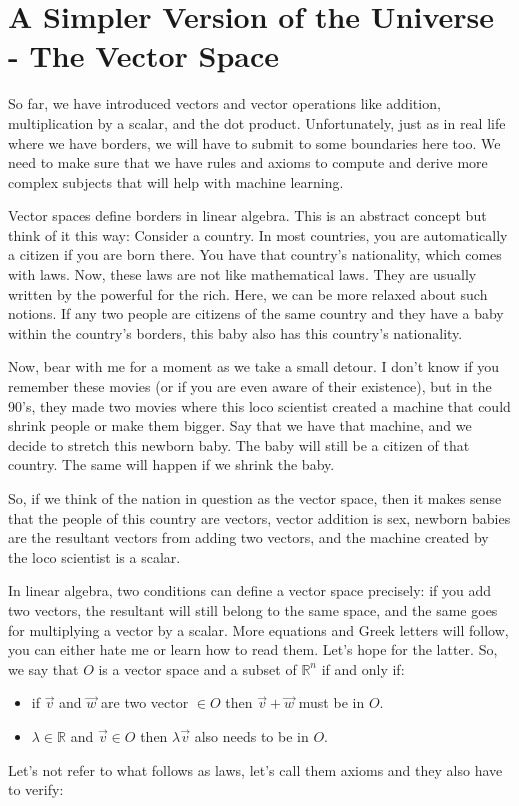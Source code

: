 \documentclass[a4,12pt,twosided,openany]{memoir}
\begin{document}
\section{A Simpler Version of the Universe - The Vector Space}
\par 
\indent
So far, we have introduced vectors and vector operations like addition, multiplication by a scalar, and the dot product. Unfortunately, just as in real life where we have borders, we will have to submit to some boundaries here too. We need to make sure that we have rules and axioms to compute and derive more complex subjects that will help with machine learning.
\par 
\indent
Vector spaces define borders in linear algebra. This is an abstract concept but think of it this way: Consider a country. In most countries, you are automatically a citizen if you are born there. You have that country’s nationality, which comes with laws. Now, these laws are not like mathematical laws. They are usually written by the powerful for the rich. Here, we can be more relaxed about such notions. If any two people are citizens of the same country and they have a baby within the country’s borders, this baby also has this country’s nationality.
\par 
\indent
Now, bear with me for a moment as we take a small detour. I don’t know if you remember these movies (or if you are even aware of their existence), but in the 90's, they made two movies where this loco scientist created a machine that could shrink people or make them bigger. Say that we have that machine, and we decide to stretch this newborn baby. The baby will still be a citizen of that country. The same will happen if we shrink the baby.
\par 
\indent
So, if we think of the nation in question as the vector space, then it makes sense that the people of this country are vectors, vector addition is sex, newborn babies are the resultant vectors from adding two vectors, and the machine created by the loco scientist is a scalar.
\par 
\indent
In linear algebra, two conditions can define a vector space precisely: if you add two vectors, the resultant will still belong to the same space, and the same goes for multiplying a vector by a scalar. More equations and Greek letters will follow, you can either hate me or learn how to read them. Let’s hope for the latter. So, we say that $O$ is a vector space and a subset of $\mathbb{R}^n$ if and only if:
\vspace{-15pt}
\begin{tcolorbox}
\begin{itemize}
\item if $\overrightarrow{v}$ and $\overrightarrow{w}$ are two vector $\in O$ then $\overrightarrow{v} +\overrightarrow{w}$ must be in $O$.
\item $\lambda \in \mathbb{R}$ and $\overrightarrow{v} \in O$ then $\lambda \overrightarrow{v}$ also needs to be in $O$.
\end{itemize}
\end{tcolorbox}
\vspace{-25pt}
Let’s not refer to what follows as laws, let’s call them axioms and they also have to verify:
\end{document}
